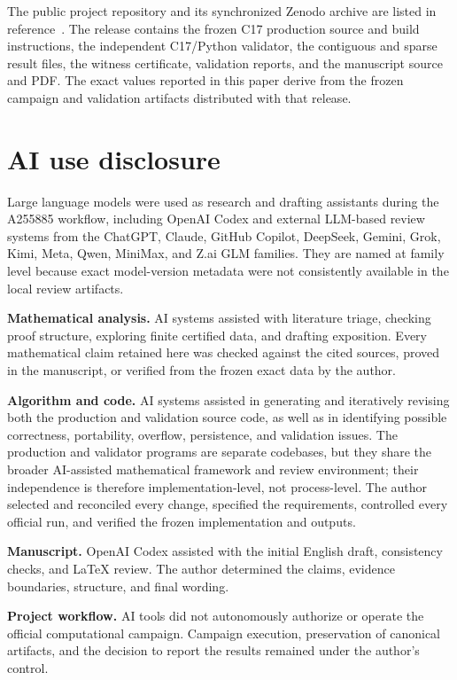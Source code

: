 \documentclass[11pt]{article}
\begin{document}
The public project repository and its synchronized Zenodo archive are listed
in reference~\cite{corti-package}.  The release contains the frozen C17
production source and build instructions, the independent C17/Python
validator, the contiguous and sparse result files, the witness certificate,
validation reports, and the manuscript source and PDF.  The exact values
reported in this paper derive from the frozen campaign and validation
artifacts distributed with that release.

\section*{AI use disclosure}

Large language models were used as research and drafting assistants during
the A255885 workflow, including OpenAI Codex and external LLM-based review
systems from the ChatGPT, Claude, GitHub Copilot, DeepSeek, Gemini, Grok,
Kimi, Meta, Qwen, MiniMax, and Z.ai GLM families.  They are named at family
level because exact model-version metadata were not consistently available in
the local review artifacts.

\textbf{Mathematical analysis.}
AI systems assisted with literature
triage, checking proof structure, exploring finite certified data, and
drafting exposition.  Every mathematical claim retained here was checked
against the cited sources, proved in the manuscript, or verified from the
frozen exact data by the author.

\textbf{Algorithm and code.}
AI systems assisted in generating and iteratively revising both the
production and validation source code, as well as in identifying possible
correctness, portability, overflow, persistence, and validation issues.  The
production and validator programs
are separate codebases, but they share the broader AI-assisted mathematical
framework and review environment; their independence is therefore
implementation-level, not process-level.  The author selected and reconciled
every change, specified the requirements, controlled every official run, and
verified the frozen implementation and outputs.

\textbf{Manuscript.}
OpenAI Codex assisted with the initial English draft, consistency checks, and
LaTeX review.  The author determined the claims, evidence boundaries,
structure, and final wording.

\textbf{Project workflow.}
AI tools did not autonomously authorize or operate the official computational
campaign.  Campaign execution, preservation of canonical artifacts, and the
decision to report the results remained under the author's control.
\end{document}

